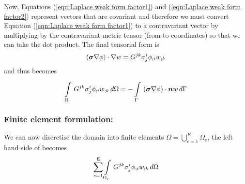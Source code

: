 Now, Equations (\ref{eqn:Laplace weak form factor1}) and (\ref{eqn:Laplace weak form factor2})
represent vectors that are covariant and
therefore we must convert Equation (\ref{eqn:Laplace weak form factor1})
to a contravariant vector by 
multiplying by the contravariant metric tensor (from  to  
coordinates) so that we can take the dot product. The final tensorial form is
\begin{equation}
  \left( \boldsymbol{\sigma}\nabla\phi \right)\cdot\nabla w = G^{jk}\sigma^{i}_{j} {\phi}_{;i}  {w}_{;k} 
\end{equation}
and thus  becomes
\begin{equation}
  \gint{\Omega}{}{G^{jk}\sigma^{i}_{j}\covarderiv{\phi}{i}\covarderiv{w}{k}}{\Omega}
  = -\gint{\Gamma}{}{\dotprod{\pbrac{\tensor{\sigma}\grad\phi}}{\vect{n}w}}{\Gamma}
  \label{eqn:Laplaceweightedresidualtensorform}
\end{equation}

\subsubsection{Finite element formulation:}
We can now discretise the domain into finite elements \ie $\Omega=
\displaystyle{\bigcup_{e=1}^{E}}\Omega_{e}$, the left hand side of
 becomes
\begin{equation}
  \displaystyle\sum_{e=1}^{E}  \displaystyle\int\limits_{\Omega_{e}}^{} \,G^{jk}\sigma^{i}_{j} {\phi}_{;i}  {w}_{;k} \,d\Omega 
\end{equation}

